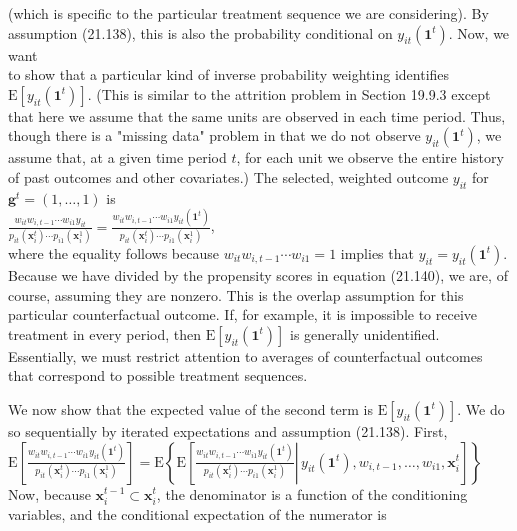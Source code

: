 \documentclass[10pt]{article}
\begin{document}
(which is specific to the particular treatment sequence we are considering). By assumption (21.138), this is also the probability conditional on $y_{i t}\left(\mathbf{1}^{t}\right)$. Now, we want\\
to show that a particular kind of inverse probability weighting identifies $\mathrm{E}\left[y_{i t}\left(\mathbf{1}^{t}\right)\right]$. (This is similar to the attrition problem in Section 19.9.3 except that here we assume that the same units are observed in each time period. Thus, though there is a "missing data" problem in that we do not observe $y_{i t}\left(\mathbf{1}^{t}\right)$, we assume that, at a given time period $t$, for each unit we observe the entire history of past outcomes and other covariates.) The selected, weighted outcome $y_{i t}$ for $\mathbf{g}^{t}=(1, \ldots, 1)$ is\\
$\frac{w_{i t} w_{i, t-1} \cdots w_{i 1} y_{i t}}{p_{i t}\left(\mathbf{x}_{i}^{t}\right) \cdots p_{i 1}\left(\mathbf{x}_{i}^{1}\right)}=\frac{w_{i t} w_{i, t-1} \cdots w_{i 1} y_{i t}\left(\mathbf{1}^{t}\right)}{p_{i t}\left(\mathbf{x}_{i}^{t}\right) \cdots p_{i 1}\left(\mathbf{x}_{i}^{1}\right)}$,\\
where the equality follows because $w_{i t} w_{i, t-1} \cdots w_{i 1}=1$ implies that $y_{i t}=y_{i t}\left(\mathbf{1}^{t}\right)$. Because we have divided by the propensity scores in equation (21.140), we are, of course, assuming they are nonzero. This is the overlap assumption for this particular counterfactual outcome. If, for example, it is impossible to receive treatment in every period, then $\mathrm{E}\left[y_{i t}\left(\mathbf{1}^{t}\right)\right]$ is generally unidentified. Essentially, we must restrict attention to averages of counterfactual outcomes that correspond to possible treatment sequences.

We now show that the expected value of the second term is $\mathrm{E}\left[y_{i t}\left(\mathbf{1}^{t}\right)\right]$. We do so sequentially by iterated expectations and assumption (21.138). First,\\
$\mathrm{E}\left[\frac{w_{i t} w_{i, t-1} \cdots w_{i 1} y_{i t}\left(\mathbf{1}^{t}\right)}{p_{i t}\left(\mathbf{x}_{i}^{t}\right) \cdots p_{i 1}\left(\mathbf{x}_{i}^{1}\right)}\right]=\mathrm{E}\left\{\mathrm{E}\left[\left.\frac{w_{i t} w_{i, t-1} \cdots w_{i 1} y_{i t}\left(\mathbf{1}^{t}\right)}{p_{i t}\left(\mathbf{x}_{i}^{t}\right) \cdots p_{i 1}\left(\mathbf{x}_{i}^{1}\right)} \right\rvert\, y_{i t}\left(\mathbf{1}^{t}\right), w_{i, t-1}, \ldots, w_{i 1}, \mathbf{x}_{i}^{t}\right]\right\}$\\
Now, because $\mathbf{x}_{i}^{t-1} \subset \mathbf{x}_{i}^{t}$, the denominator is a function of the conditioning variables, and the conditional expectation of the numerator is
\end{document}
